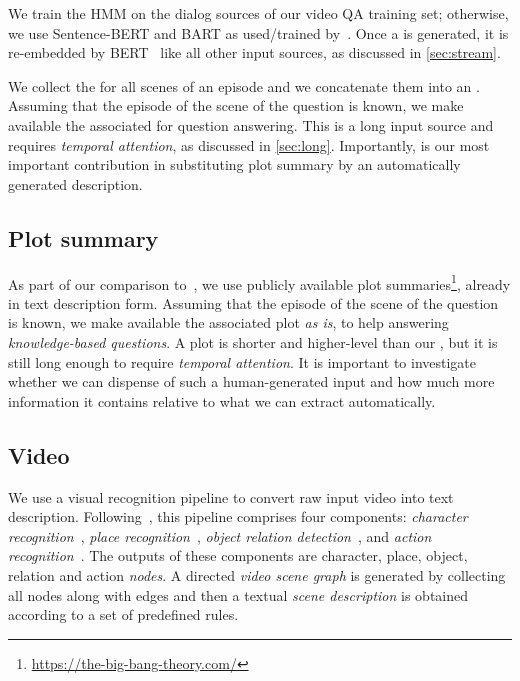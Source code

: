 \documentclass[10pt,twocolumn,letterpaper]{article}
\makeatletter
\renewcommand\paragraph{\@startsection{paragraph}{4}{\z@}{1ex}{-1em}{\normalfont\normalsize\bfseries}}
\makeatother
\begin{document}
We train the HMM on the dialog sources of our video QA training set; otherwise, we use Sentence-BERT and BART as used/trained by~\cite{chen2020multi}. Once a \sceneSum is generated, it is re-embedded by BERT~\cite{devlin-etal-2019-bert} like all other input sources, as discussed in \autoref{sec:stream}.



\paragraph{\up[\episodeSum]}

We collect the \sceneSums for all scenes of an episode and we concatenate them into an \emph{\episodeSum}. Assuming that the episode of the scene of the question is known, we make available the associated \episodeSum for question answering. This is a long input source and requires \emph{temporal attention}, as discussed in \autoref{sec:long}. Importantly, \episodeSum is our most important contribution in substituting plot summary by an automatically generated description.



\subsection{Plot summary}
\label{sec:plot}
As part of our comparison to~\cite{garcia2020knowledge}, we use publicly available plot summaries\footnote{\url{https://the-big-bang-theory.com/}}, already in text description form. Assuming that the episode of the scene of the question is known, we make available the associated plot \emph{as is}, to help answering \emph{knowledge-based questions}. A plot is shorter and higher-level than our \episodeSum, but it is still long enough to require \emph{temporal attention}. It is important to investigate whether we can dispense of such a human-generated input and how much more information it contains relative to what we can extract automatically. 



\subsection{Video}
\label{sec:video}

We use a visual recognition pipeline to convert raw input video into text description. Following~\cite{garcia2020knowledge}, this pipeline comprises four components: \emph{character recognition}~\cite{schroff2015facenet}, \emph{place recognition}~\cite{zhou2017places}, \emph{object relation detection}~\cite{zhang2019large}, and \emph{action recognition}~\cite{wu2019long}. The outputs of these components are character, place, object, relation and action \emph{nodes}. A directed \emph{video scene graph} is generated by collecting all nodes along with edges and then a textual \emph{scene description} is obtained according to a set of predefined rules.
\end{document}
